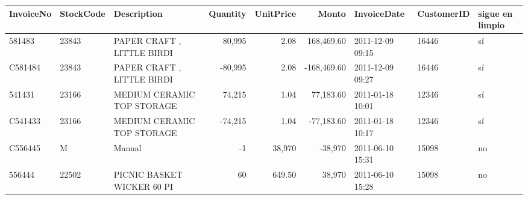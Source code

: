 \begin{tabular}{lllrrrlll}
\toprule
InvoiceNo & StockCode & Description & Quantity & UnitPrice & Monto & InvoiceDate & CustomerID & sigue en limpio \\
\midrule
581483 & 23843 & PAPER CRAFT , LITTLE BIRDI & 80,995 & 2.08 & 168,469.60 & 2011-12-09 09:15 & 16446 & sí \\
C581484 & 23843 & PAPER CRAFT , LITTLE BIRDI & -80,995 & 2.08 & -168,469.60 & 2011-12-09 09:27 & 16446 & sí \\
541431 & 23166 & MEDIUM CERAMIC TOP STORAGE & 74,215 & 1.04 & 77,183.60 & 2011-01-18 10:01 & 12346 & sí \\
C541433 & 23166 & MEDIUM CERAMIC TOP STORAGE & -74,215 & 1.04 & -77,183.60 & 2011-01-18 10:17 & 12346 & sí \\
C556445 & M & Manual & -1 & 38,970 & -38,970 & 2011-06-10 15:31 & 15098 & no \\
556444 & 22502 & PICNIC BASKET WICKER 60 PI & 60 & 649.50 & 38,970 & 2011-06-10 15:28 & 15098 & no \\
\bottomrule
\end{tabular}
